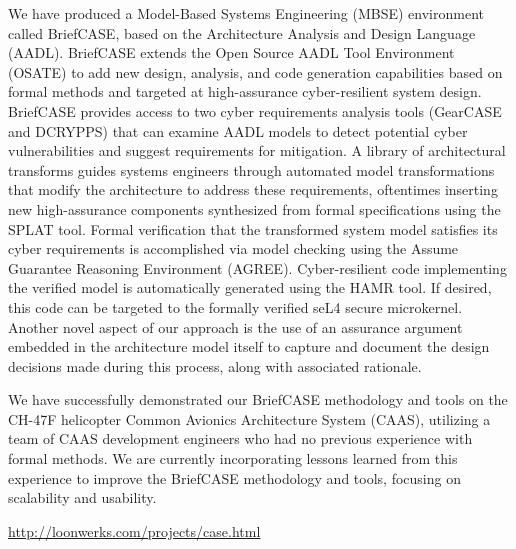 We have produced a Model-Based Systems Engineering (MBSE) environment
called BriefCASE, based on the Architecture Analysis and Design
Language (AADL). BriefCASE extends the Open Source AADL
Tool Environment (OSATE) to add new design, analysis, and code
generation capabilities based on formal methods and targeted at
high-assurance cyber-resilient system design. BriefCASE provides
access to two cyber requirements analysis tools (GearCASE
and DCRYPPS) that can examine AADL models to detect potential
cyber vulnerabilities and suggest requirements for mitigation.
A library of architectural transforms guides systems engineers
through automated model transformations that modify the
architecture to address these requirements, oftentimes inserting new
high-assurance components synthesized from formal
specifications using the SPLAT tool. Formal verification that the
transformed system model satisfies its cyber requirements is accomplished
via model checking using the Assume Guarantee Reasoning
Environment (AGREE). Cyber-resilient code implementing the
verified model is automatically generated using the HAMR
tool. If desired, this code can be targeted to the formally
verified seL4 secure microkernel.  Another novel aspect of our approach is
the use of an assurance argument embedded in the architecture model
itself to capture and document the design decisions made during this
process, along with associated rationale.

We have successfully demonstrated our BriefCASE methodology and tools on the
CH-47F helicopter Common Avionics Architecture System (CAAS), utilizing a team of CAAS
development engineers who had no previous experience with formal methods.  We
are currently incorporating lessons learned from this experience to improve the BriefCASE
methodology and tools, focusing on scalability and usability.


\url{http://loonwerks.com/projects/case.html}